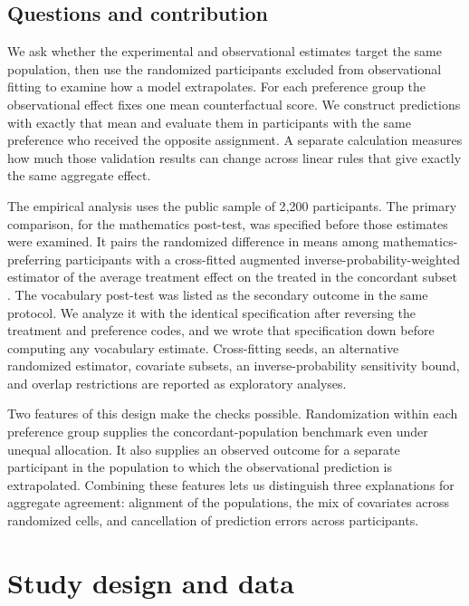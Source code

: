 \documentclass[twoside,11pt]{article}
\begin{document}
\subsection{Questions and contribution}

We ask whether the experimental and observational estimates target the same population, then use the randomized participants excluded from observational fitting to examine how a model extrapolates. For each preference group the observational effect fixes one mean counterfactual score. We construct predictions with exactly that mean and evaluate them in participants with the same preference who received the opposite assignment. A separate calculation measures how much those validation results can change across linear rules that give exactly the same aggregate effect.

The empirical analysis uses the public sample of 2{,}200 participants. The primary comparison, for the mathematics post-test, was specified before those estimates were examined. It pairs the randomized difference in means among mathematics-preferring participants with a cross-fitted augmented inverse-probability-weighted estimator of the average treatment effect on the treated in the concordant subset \citep{bang2005,chernozhukov2018}. The vocabulary post-test was listed as the secondary outcome in the same protocol. We analyze it with the identical specification after reversing the treatment and preference codes, and we wrote that specification down before computing any vocabulary estimate. Cross-fitting seeds, an alternative randomized estimator, covariate subsets, an inverse-probability sensitivity bound, and overlap restrictions are reported as exploratory analyses.

Two features of this design make the checks possible. Randomization within each preference group supplies the concordant-population benchmark even under unequal allocation. It also supplies an observed outcome for a separate participant in the population to which the observational prediction is extrapolated. Combining these features lets us distinguish three explanations for aggregate agreement: alignment of the populations, the mix of covariates across randomized cells, and cancellation of prediction errors across participants.

\section{Study design and data}
\label{sec:design}
\end{document}
